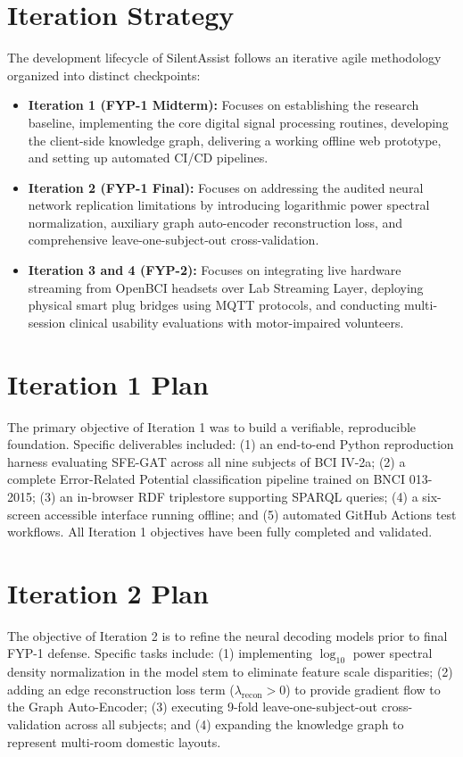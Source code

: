 \documentclass[12pt,a4paper]{report}
\begin{document}
\section{Iteration Strategy}
The development lifecycle of SilentAssist follows an iterative agile methodology organized into distinct checkpoints:
\begin{itemize}[leftmargin=1.5em]
    \item \textbf{Iteration 1 (FYP-1 Midterm):} Focuses on establishing the research baseline, implementing the core digital signal processing routines, developing the client-side knowledge graph, delivering a working offline web prototype, and setting up automated CI/CD pipelines.
    \item \textbf{Iteration 2 (FYP-1 Final):} Focuses on addressing the audited neural network replication limitations by introducing logarithmic power spectral normalization, auxiliary graph auto-encoder reconstruction loss, and comprehensive leave-one-subject-out cross-validation.
    \item \textbf{Iteration 3 and 4 (FYP-2):} Focuses on integrating live hardware streaming from OpenBCI headsets over Lab Streaming Layer, deploying physical smart plug bridges using MQTT protocols, and conducting multi-session clinical usability evaluations with motor-impaired volunteers.
\end{itemize}

\section{Iteration 1 Plan}
The primary objective of Iteration 1 was to build a verifiable, reproducible foundation. Specific deliverables included: (1) an end-to-end Python reproduction harness evaluating SFE-GAT across all nine subjects of BCI IV-2a; (2) a complete Error-Related Potential classification pipeline trained on BNCI 013-2015; (3) an in-browser RDF triplestore supporting SPARQL queries; (4) a six-screen accessible interface running offline; and (5) automated GitHub Actions test workflows. All Iteration 1 objectives have been fully completed and validated.

\section{Iteration 2 Plan}
The objective of Iteration 2 is to refine the neural decoding models prior to final FYP-1 defense. Specific tasks include: (1) implementing $\log_{10}$ power spectral density normalization in the model stem to eliminate feature scale disparities; (2) adding an edge reconstruction loss term ($\lambda_{\mathrm{recon}} > 0$) to provide gradient flow to the Graph Auto-Encoder; (3) executing 9-fold leave-one-subject-out cross-validation across all subjects; and (4) expanding the knowledge graph to represent multi-room domestic layouts.
\end{document}
